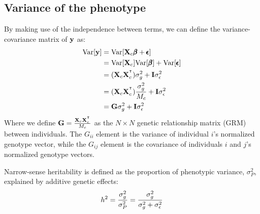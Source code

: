 \documentclass[12pt]{article}
\begin{document}
\subsection{Variance of the phenotype}
By making use of the independence between terms, we can define the variance-covariance matrix of $\mathbf{y}$ as:
\begin{align*}
    \mathrm{Var}[\mathbf{y}] &= \mathrm{Var}[\mathbf{X}_c \pmb{\beta} + \pmb{\epsilon}] \\
    &= \mathrm{Var}[\mathbf{X}_c] \mathrm{Var}[\pmb{\beta}] + \mathrm{Var}[\pmb{\epsilon}] \\
    &= (\mathbf{X}_c \mathbf{X}_c^{^\intercal}) \sigma_g^2 + \mathbf{I} \sigma_{\epsilon}^2 \\
    &= (\mathbf{X}_c \mathbf{X}_c^{^\intercal}) \frac{\sigma_g^2}{M_c} + \mathbf{I} \sigma_{\epsilon}^2 \\
    &= \mathbf{G} \sigma_g^2 + \mathbf{I} \sigma_{\epsilon}^2 \\
\end{align*}
Where we define $\mathbf{G} = \frac{\mathbf{X}_c \mathbf{X}_c^{^\intercal}}{M_c}$ as the $N \times N$ genetic relationship matrix (GRM) between individuals.
The $G_{ii}$ element is the variance of individual $i$'s normalized genotype vector, while the $G_{ij}$ element is the covariance of individuals $i$ and $j$'s normalized genotype vectors.

Narrow-sense heritability is defined as the proportion of phenotypic variance, $\sigma_P^2$, explained by additive genetic effects:
$$ h^2 = \frac{\sigma_g^2}{\sigma_P^2} = \frac{\sigma_g^2}{\sigma_g^2 + \sigma_{\epsilon}^2} $$
\end{document}
